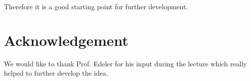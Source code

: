\documentclass[notitlepage, a4paper, 11pt]{scrartcl}
\begin{document}
\begin{multicols}{2}
Therefore it is a good starting point for further development.

\section{Acknowledgement}

We would like to thank Prof. Edeler for his input during the lecture which really helped to further develop the idea.

\end{multicols}

 

\end{document}
